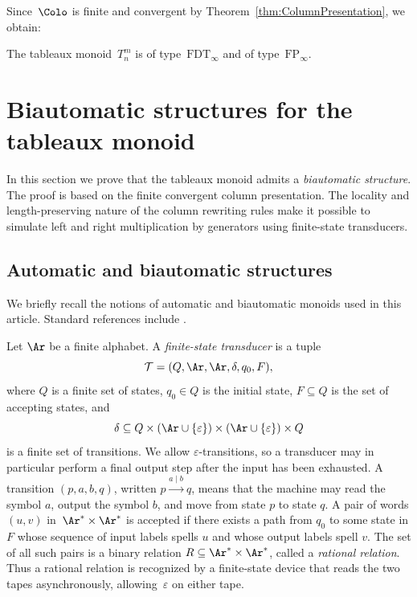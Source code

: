 \documentclass[a4paper, twoside, 11pt, english]{article}
\begin{document}
Since~$\Colo$ is finite and convergent by
Theorem~\ref{thm:ColumnPresentation}, we obtain:

\begin{corollary}
\label{Corollary:FP-FDT}
The tableaux monoid~$T_n^m$ is of type~$\mathrm{FDT}_\infty$ and of type~$\mathrm{FP}_\infty$.
\end{corollary}




\section{Biautomatic structures for the tableaux monoid}
\label{S:BiautomaticStructuresTableauxMonoid}

In this section we prove that the tableaux monoid admits a
\emph{biautomatic structure}.
The proof is based on the finite convergent column presentation.
The locality and length-preserving nature of the column rewriting
rules make it possible to simulate left and right multiplication by
generators using finite-state transducers.


\subsection{Automatic and biautomatic structures}
\label{SS:Automaticity}

We briefly recall the notions of automatic and biautomatic monoids
used in this article. Standard references include
\cite{DuncanRobertsonRuskuc99,CainGrayMalheiro19,CainGrayMalheiro15b}.

Let $\Ar$ be a finite alphabet.
A \emph{finite-state transducer} is a tuple
\[
\mathcal T = (Q,\Ar,\Ar,\delta,q_0,F),
\]
where $Q$ is a finite set of states, $q_0\in Q$ is the initial state,
$F\subseteq Q$ is the set of accepting states, and
\[
\delta \subseteq Q\times (\Ar\cup\{\varepsilon\})
\times (\Ar\cup\{\varepsilon\})\times Q
\]
is a finite set of transitions.
We allow $\varepsilon$-transitions, so a transducer may in particular perform a final output step after the input has been exhausted.
A transition $(p,a,b,q)$, written
$p \xrightarrow{a\mid b} q$,
means that the machine may read the symbol $a$, output the symbol $b$,
and move from state $p$ to state $q$.
A pair of words $(u,v)$ in~$\Ar^*\times\Ar^*$ is accepted if
there exists a path from $q_0$ to some state in $F$
whose sequence of input labels spells $u$ and whose output labels spell $v$.
The set of all such pairs is a binary relation
$R\subseteq\Ar^*\times\Ar^*$,
called a \emph{rational relation}.
Thus a rational relation is recognized by a finite-state device that reads
the two tapes asynchronously, allowing~$\varepsilon$ on either tape.
\end{document}
